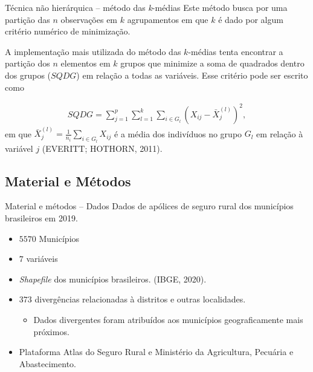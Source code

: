 \documentclass[aspectratio=169]{beamer}
\begin{document}
\begin{frame}{Técnica não hierárquica -- método das \textit{k}-médias}
    Este método busca por uma partição das $n$ observações em $k$ agrupamentos em que $k$ é dado por algum critério numérico de minimização. 
    
    A implementação mais utilizada do método das $k$-médias tenta encontrar a partição dos $n$ elementos em $k$ grupos que minimize a soma de quadrados dentro dos grupos ($SQDG$) em relação a todas as variáveis. Esse critério pode ser escrito como 
    
    \begin{block}{}
    \begin{align*}
    SQDG = \sum_{j=1}^{p}\sum_{l=1}^{k}\sum_{i \in G_l}(X_{ij} - \bar{X}_{j}^{(l)})^2,
    \end{align*}
    em que $\bar{X}_{j}^{(l)} = \displaystyle\frac{1}{n_i}\sum_{i \in G_l}X_{ij}$ é a média dos indivíduos no grupo $G_l$ em relação à variável $j$ (EVERITT; HOTHORN, 2011).
    \end{block}
\end{frame}

\subsection{Material e Métodos}

\begin{frame}{Material e métodos -- Dados}
	Dados de apólices de seguro rural dos municípios brasileiros em 2019. 
	\vspace{0.5cm}
    \begin{itemize}
        \item $5570$ Municípios
        \item $7$ variáveis
        \item \textit{Shapefile} dos municípios brasileiros. (IBGE, 2020).
        \item $373$ divergências relacionadas à distritos e outras localidades.
        \begin{itemize}
            \item Dados divergentes foram atribuídos aos municípios geograficamente mais próximos. 
        \end{itemize}
        \item Plataforma Atlas do Seguro Rural e Ministério da Agricultura, Pecuária e Abastecimento.
    \end{itemize}
\end{frame}
\end{document}
